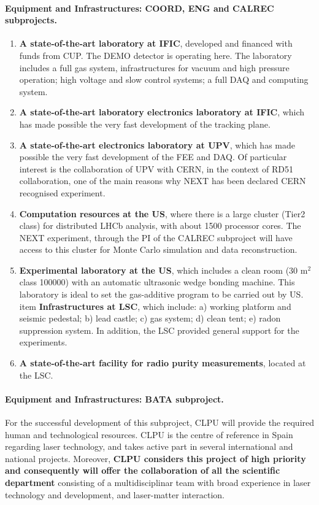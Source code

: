 \paragraph{Equipment and Infrastructures: COORD, ENG and CALREC subprojects.}
\begin{enumerate}
\item {\bf A state-of-the-art laboratory at IFIC}, developed and financed with funds from CUP. The DEMO detector is operating here. The laboratory includes a full gas system, infrastructures for vacuum and high pressure operation; high voltage and slow control systems; a full DAQ and computing system. 
\item {\bf A state-of-the-art laboratory electronics laboratory at IFIC}, which has made possible the very fast development of the tracking plane. 
\item {\bf A state-of-the-art electronics laboratory at UPV}, which has made possible the very fast development of the FEE and DAQ. Of particular interest is the collaboration of UPV with CERN, in the context of RD51 collaboration, one of the main reasons why NEXT has been declared CERN recognised experiment.
\item {\bf Computation resources at the US}, where there is a large cluster (Tier2 class) 
for distributed LHCb analysis, with about 1500 processor cores. The NEXT experiment, through the PI of the CALREC subproject will have access to this cluster for Monte Carlo simulation and data reconstruction. 
\item {\bf Experimental laboratory at the US}, which 
includes a clean room (30 m$^2$ class 100000) with an automatic ultrasonic wedge bonding machine. This laboratory is ideal to set the gas-additive program to be carried out by US. 
item {\bf Infrastructures at LSC}, which include: a) working platform and seismic pedestal; b) lead castle; c) gas system; d) clean tent; e) radon suppression system. In addition, the LSC provided general support for the experiments. 
\item {\bf A state-of-the-art facility for radio purity measurements}, located at the LSC. 
\end{enumerate}

\paragraph{Equipment and Infrastructures: BATA subproject.}
For the successful development of this subproject, CLPU will provide the required human and technological resources. CLPU is the centre of reference in Spain regarding laser technology, and takes active part in several international and national projects.  Moreover, {\bf CLPU considers this project of high priority and consequently will offer the collaboration of all the scientific department} consisting of a multidisciplinar team with broad experience in laser technology and development, and laser-matter interaction. 

